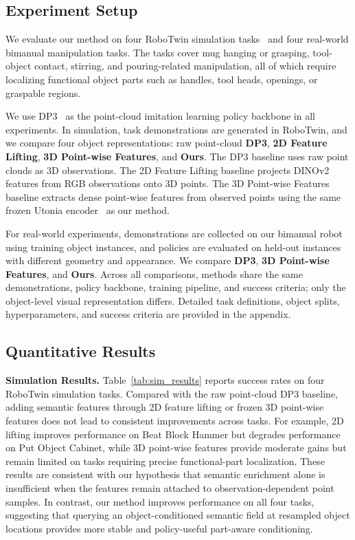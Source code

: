 \subsection{Experiment Setup}
We evaluate our method on four RoboTwin simulation tasks~\cite{chen2025robotwin} and four real-world bimanual manipulation tasks. The tasks cover mug hanging or grasping, tool-object contact, stirring, and pouring-related manipulation, all of which require localizing functional object parts such as handles, tool heads, openings, or graspable regions.

We use DP3~\cite{ke20243d} as the point-cloud imitation learning policy backbone in all experiments. In simulation, task demonstrations are generated in RoboTwin, and we compare four object representations: raw point-cloud \textbf{DP3}, \textbf{2D Feature Lifting}, \textbf{3D Point-wise Features}, and \textbf{Ours}. The DP3 baseline uses raw point clouds as 3D observations. The 2D Feature Lifting baseline projects DINOv2~\cite{oquab2023dinov2} features from RGB observations onto 3D points. The 3D Point-wise Features baseline extracts dense point-wise features from observed points using the same frozen Utonia encoder~\cite{zhang2026utonia} as our method.

For real-world experiments, demonstrations are collected on our bimanual robot using training object instances, and policies are evaluated on held-out instances with different geometry and appearance. We compare \textbf{DP3}, \textbf{3D Point-wise Features}, and \textbf{Ours}. Across all comparisons, methods share the same demonstrations, policy backbone, training pipeline, and success criteria; only the object-level visual representation differs. Detailed task definitions, object splits, hyperparameters, and success criteria are provided in the appendix.

\subsection{Quantitative Results}
\textbf{Simulation Results.}
Table~\ref{tab:sim_results} reports success rates on four RoboTwin simulation tasks. Compared with the raw point-cloud DP3 baseline, adding semantic features through 2D feature lifting or frozen 3D point-wise features does not lead to consistent improvements across tasks. For example, 2D lifting improves performance on Beat Block Hammer but degrades performance on Put Object Cabinet, while 3D point-wise features provide moderate gains but remain limited on tasks requiring precise functional-part localization. These results are consistent with our hypothesis that semantic enrichment alone is insufficient when the features remain attached to observation-dependent point samples. In contrast, our method improves performance on all four tasks, suggesting that querying an object-conditioned semantic field at resampled object locations provides more stable and policy-useful part-aware conditioning.

